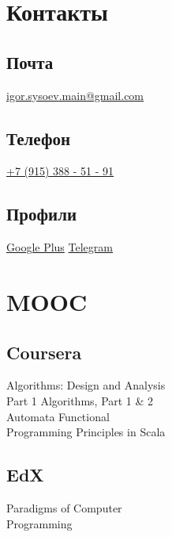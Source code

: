 \documentclass[a4paper]{curricula-vitae}
\begin{document}
\begin{minipage}[t]{0.33\textwidth}%

\section{Контакты} 

\subsection{Почта}
\href{mailto:igor.sysoev.main@gmail.com}{igor.sysoev.main@gmail.com}

\insertspace

\subsection{Телефон}
\href{tel:+79153885191}{+7 (915) 388 - 51 - 91}

\insertspace

\subsection{Профили}
\href{https://plus.google.com/+%D0%98%D0%B3%D0%BE%D1%80%D1%8C%D0%A1%D1%8B%D1%81%D0%BE%D0%B5%D0%B2}{Google Plus}
\textbullet{} \href{https://t.me/hoholic}{Telegram}

\insertspace

\section{MOOC}

\subsection{Coursera}
Algorithms: Design and Analysis \\
Part 1 \textbullet{} Algorithms, Part 1 \& 2 \\ 
Automata \textbullet{} Functional \\
Programming Principles in Scala

\insertspace

\subsection{EdX}
Paradigms of Computer \\
Programming

\insertspace


\end{minipage}
\end{document}
